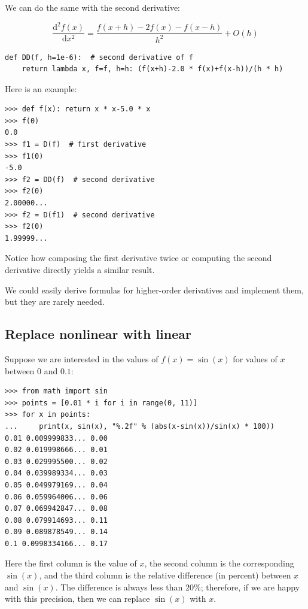 \documentclass[justified, sixbynine]{tufte-book}
\def\ft{\small\tt}
\theoremstyle{plain}%
\newtheorem * {corollary}{Corollary}
\theoremstyle{definition}
\theoremstyle{remark}
\newtheorem * {remark}{Remark}
\newtheorem * {note}{Note}
\begin{document}
\begin{fullwidth}
We can do the same with the second derivative:

\begin{equation}
  \frac{\textrm{d}^2f(x)}{\textrm{d}x^2} = \frac{f(x+h)-2f(x)-f(x-h)}{h^2} + O(h)
\end{equation}

\begin{lstlisting}[caption={in file: {\ft nlib.py}}]
def DD(f, h=1e-6):  # second derivative of f
    return lambda x, f=f, h=h: (f(x+h)-2.0 * f(x)+f(x-h))/(h * h)
\end{lstlisting}

Here is an example:

\begin{lstlisting}[caption={in file: {\ft nlib.py}}]
>>> def f(x): return x * x-5.0 * x
>>> f(0)
0.0
>>> f1 = D(f)  # first derivative
>>> f1(0)
-5.0
>>> f2 = DD(f)  # second derivative
>>> f2(0)
2.00000...
>>> f2 = D(f1)  # second derivative
>>> f2(0)
1.99999...
\end{lstlisting}

Notice how composing the first derivative twice or computing the second derivative directly yields a similar result.

We could easily derive formulas for higher-order derivatives and implement them, but they are rarely needed.

\goodbreak\subsection{Replace nonlinear with linear}


Suppose we are interested in the values of $f(x)=\sin(x)$ for values of $x$ between $0$ and $0.1$:

\begin{lstlisting}
>>> from math import sin
>>> points = [0.01 * i for i in range(0, 11)]
>>> for x in points:
...     print(x, sin(x), "%.2f" % (abs(x-sin(x))/sin(x) * 100))
0.01 0.009999833... 0.00
0.02 0.019998666... 0.01
0.03 0.029995500... 0.02
0.04 0.039989334... 0.03
0.05 0.049979169... 0.04
0.06 0.059964006... 0.06
0.07 0.069942847... 0.08
0.08 0.079914693... 0.11
0.09 0.089878549... 0.14
0.1 0.0998334166... 0.17
\end{lstlisting}
Here the first column is the value of $x$, the second column is the corresponding $\sin(x)$, and the third column is the relative difference (in percent) between $x$ and $\sin(x)$. The difference is always less than $20\%$; therefore, if we are happy with this precision, then we can replace $\sin(x)$ with $x$.


\end{fullwidth}
\end{document}
